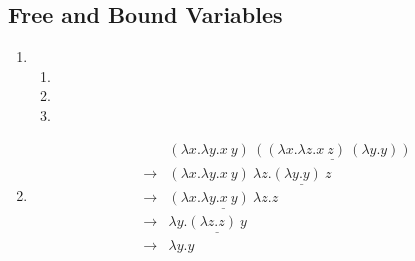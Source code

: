 \documentclass[10pt]{article}
\newcommand{\steps}{\longrightarrow}
\newcommand{\apply}{\lambda x. \lambda y. x~y}
\begin{document}
\subsection*{ Free and Bound Variables}
\begin{enumerate}
  \item \begin{enumerate}
    \item
    \item
    \item
  \end{enumerate}
  \item \begin{eqnarray*}
    &        & (\apply) ~ \underline{((\lambda x. \lambda z. x~z) ~ (\lambda y. y))} \\
    & \steps & (\apply) ~ \lambda z. \underline{(\lambda y.y) ~ z} \\
    & \steps & \underline{(\apply)~\lambda z. z} \\
    & \steps & \lambda y. \underline{(\lambda z. z)~y} \\
    & \steps & \lambda y. y
  \end{eqnarray*}
\end{enumerate}
\end{document}
